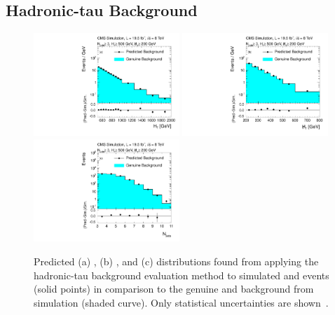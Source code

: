 \subsection{Hadronic-tau Background}
\label{subsec:RA2_tauhad}
\begin{figure}[!t]
  \centering

  \begin{minipage}[c]{1.\textwidth}
    \begin{center}
      \includegraphics[width=0.49\textwidth]{figures/RA2_TauHad1.pdf}%
      \includegraphics[width=0.49\textwidth]{figures/RA2_TauHad2.pdf}\\ 
      \includegraphics[width=0.49\textwidth]{figures/RA2_TauHad3.pdf}
    \end{center}
  \end{minipage}

  \caption{Predicted (a) \HT, (b) \MHT, and (c) \NJets distributions found from applying the hadronic-tau background evaluation method to simulated \ttbar and \WJets events (solid points) in comparison to the genuine \ttbar and \WJets background from simulation (shaded curve). Only statistical uncertainties are shown~\cite{Chatrchyan:2014lfa}.}
  \label{fig:ra2_tauhad}
\end{figure}
